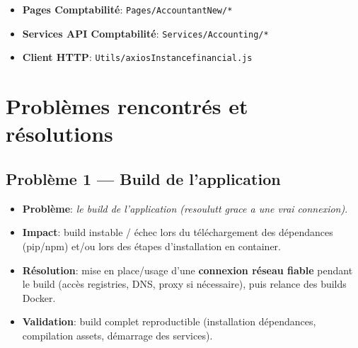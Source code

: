 \documentclass[12pt,a4paper]{article}
\begin{document}
\begin{itemize}[leftmargin=1.2cm]
  \item \textbf{Pages Comptabilité}: \texttt{Pages/AccountantNew/*}
  \item \textbf{Services API Comptabilité}: \texttt{Services/Accounting/*}
  \item \textbf{Client HTTP}: \texttt{Utils/axiosInstancefinancial.js}
\end{itemize}

\section{Problèmes rencontrés et résolutions}

\subsection{Problème 1 --- Build de l’application}
\begin{itemize}[leftmargin=1.2cm]
  \item \textbf{Problème}: \textit{le build de l'application (resoulutt grace a une vrai connexion)}.
  \item \textbf{Impact}: build instable / échec lors du téléchargement des dépendances (pip/npm) et/ou lors des étapes d’installation en container.
  \item \textbf{Résolution}: mise en place/usage d’une \textbf{connexion réseau fiable} pendant le build (accès registries, DNS, proxy si nécessaire), puis relance des builds Docker.
  \item \textbf{Validation}: build complet reproductible (installation dépendances, compilation assets, démarrage des services).
\end{itemize}
\end{document}
